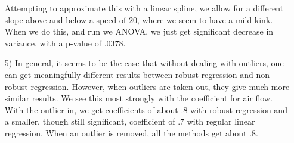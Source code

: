 \documentclass[11pt]{article}
\theoremstyle{definition}
\begin{document}
\begin{itemize}
        Attempting to approximate this with a linear spline, we allow for a different slope above and below a speed of $20$, where we seem to have a mild kink. When we do this, and run we ANOVA, we just get significant decrease in variance, with a p-value of $.0378$. \\
        
    \item[5)]
        In general, it seems to be the case that without dealing with outliers, one can get meaningfully different results between robust regression and non-robust regression. However, when outliers are taken out, they give much more similar results. We see this most strongly with the coefficient for air flow. With the outlier in, we get coefficients of about $.8$ with robust regression and a smaller, though still significant, coefficient of $.7$ with regular linear regression. When an outlier is removed, all the methods get about $.8$.\\


\end{itemize}
\end{document}
